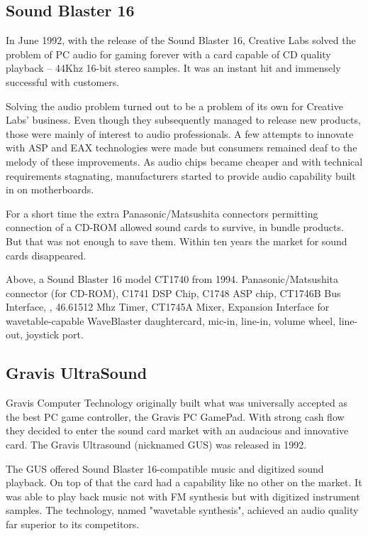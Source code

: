\subsection{Sound Blaster 16}
 In June 1992, with the release of the Sound Blaster 16, Creative Labs solved the problem of PC audio for gaming forever with a card capable of CD quality playback -- 44Khz 16-bit stereo samples. It was an instant hit and immensely successful with customers.\\
\par
{}
\par
Solving the audio problem turned out to be a problem of its own for Creative Labs' business. Even though they subsequently managed to release new products, those were mainly of interest to audio professionals. A few attempts to innovate with ASP and EAX technologies were made but consumers remained deaf to the melody of these improvements. As audio chips became cheaper and with technical requirements stagnating, manufacturers started to provide audio capability built in on motherboards.\\
\par
For a short time the extra Panasonic/Matsushita connectors permitting connection of a CD-ROM allowed sound cards to survive, in bundle products. But that was not enough to save them. Within ten years the market for sound cards disappeared.\\
\par
{}
\par
Above, a Sound Blaster 16 model CT1740 from 1994.  Panasonic/Matsushita connector (for CD-ROM),  C1741 DSP Chip,  C1748 ASP chip,  CT1746B Bus Interface, , 46.61512 Mhz Timer,  CT1745A Mixer,  Expansion Interface for wavetable-capable WaveBlaster daughtercard,  mic-in, line-in, volume wheel, line-out, joystick port.







\subsection{Gravis UltraSound}
Gravis Computer Technology originally built what was universally accepted as the best PC game controller, the Gravis PC GamePad. With strong cash flow they decided to enter the sound card market with an audacious and innovative card. The Gravis Ultrasound (nicknamed GUS) was released in 1992.\\
\par
The GUS offered Sound Blaster 16-compatible music and digitized sound playback. On top of that the card had a capability like no other on the market. It was able to play back music not with FM synthesis but with digitized instrument samples. The technology, named "wavetable synthesis", achieved an audio quality far superior to its competitors.


